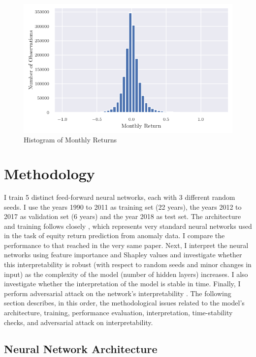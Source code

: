 	
	\begin{center}
		\begin{figure}
			\includegraphics{Figures/hist_returns.pdf}
			\caption{Histogram of Monthly Returns}
			\label{fig:hist_returns}
		\end{figure}
	\end{center}


\section{Methodology}

	I train 5 distinct feed-forward neural networks, each with 3 different random seeds. I use the years 1990 to 2011 as training set (22 years), the years 2012 to 2017 as validation set (6 years) and the year 2018 as test set. The architecture and training follows closely \cite{gu2020empirical}, which represents very standard neural networks used in the task of equity return prediction from anomaly data. I compare the performance to that reached in the very same paper. Next, I interpret the neural networks using feature importance and Shapley values and investigate whether this interpretability is robust (with respect to random seeds and minor changes in input) as the complexity of the model (number of hidden layers) increases. I also investigate whether the interpretation of the model is stable in time. Finally, I perform adversarial attack on the network's interpretability \cite{ghorbani2019interpretation}. The following section describes, in this order, the methodological issues related to the model's architecture, training, performance evaluation, interpretation, time-stability checks, and adversarial attack on interpretability.    
	
	\subsection{Neural Network Architecture}
	
